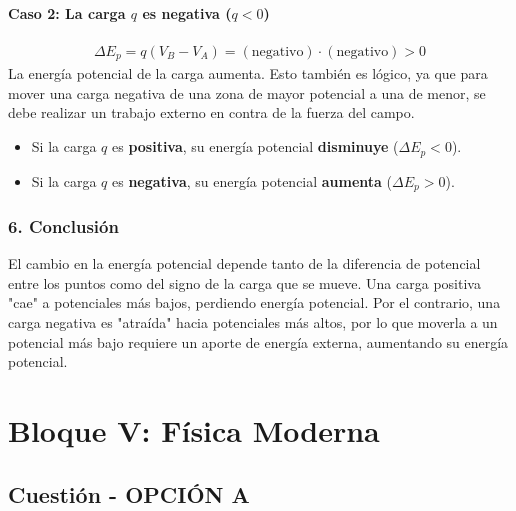 \paragraph{Caso 2: La carga $q$ es negativa ($q<0$)}
\begin{gather}
    \Delta E_p = q(V_B - V_A) = (\text{negativo}) \cdot (\text{negativo}) > 0
\end{gather}
La energía potencial de la carga aumenta. Esto también es lógico, ya que para mover una carga negativa de una zona de mayor potencial a una de menor, se debe realizar un trabajo externo en contra de la fuerza del campo.

\begin{cajaresultado}
\begin{itemize}
    \item Si la carga $q$ es \textbf{positiva}, su energía potencial \textbf{disminuye} ($\Delta E_p < 0$).
    \item Si la carga $q$ es \textbf{negativa}, su energía potencial \textbf{aumenta} ($\Delta E_p > 0$).
\end{itemize}
\end{cajaresultado}

\subsubsection*{6. Conclusión}
\begin{cajaconclusion}
El cambio en la energía potencial depende tanto de la diferencia de potencial entre los puntos como del signo de la carga que se mueve. Una carga positiva "cae" a potenciales más bajos, perdiendo energía potencial. Por el contrario, una carga negativa es "atraída" hacia potenciales más altos, por lo que moverla a un potencial más bajo requiere un aporte de energía externa, aumentando su energía potencial.
\end{cajaconclusion}

\newpage

\section{Bloque V: Física Moderna}
\label{sec:moderna_2011_sep_ext}

\subsection{Cuestión - OPCIÓN A}
\label{subsec:5A_2011_sep_ext}

